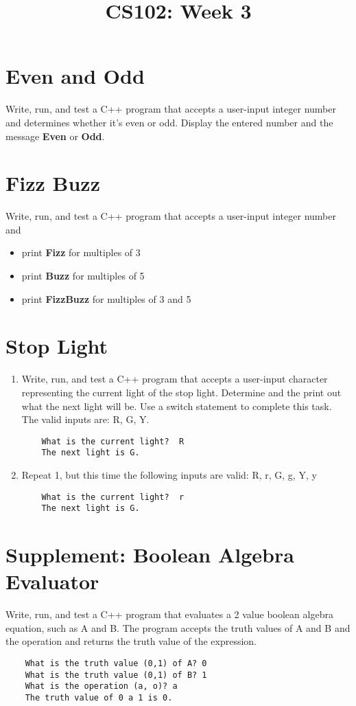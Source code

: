 \documentclass{article}
\begin{document}
\title{CS102: Week 3}

\maketitle

\section*{Even and Odd}
Write, run, and test a C++ program that accepts a user-input integer number and determines whether it’s even or odd. Display the entered number and the message \textbf{Even} or \textbf{Odd}.

\section*{Fizz Buzz}
Write, run, and test a C++ program that accepts a user-input integer number and  
\begin{itemize}
	\item print \textbf{Fizz} for multiples of 3
	\item print \textbf{Buzz} for multiples of 5
	\item print \textbf{FizzBuzz} for multiples of 3 and 5
\end{itemize}

\section*{Stop Light}
\begin{enumerate}
\item Write, run, and test a C++ program that accepts a user-input character representing the current light of the stop light. Determine and the print out what the next light will be. Use a switch statement to complete this task. The valid inputs are: R, G, Y.
\begin{verbatim}
	What is the current light?  R
	The next light is G.
\end{verbatim}
\item Repeat 1, but this time the following inputs are valid: R, r, G, g, Y, y
\begin{verbatim}
	What is the current light?  r
	The next light is G.
\end{verbatim}
\end{enumerate}


\section*{Supplement: Boolean Algebra Evaluator}
Write, run, and test a C++ program that evaluates a 2 value boolean algebra equation, such as A and B.  The program accepts the truth values of A and B and the operation and returns the truth value of the expression. 
\begin{verbatim}
	What is the truth value (0,1) of A? 0
	What is the truth value (0,1) of B? 1
	What is the operation (a, o)? a
	The truth value of 0 a 1 is 0.
\end{verbatim}
\end{document}
